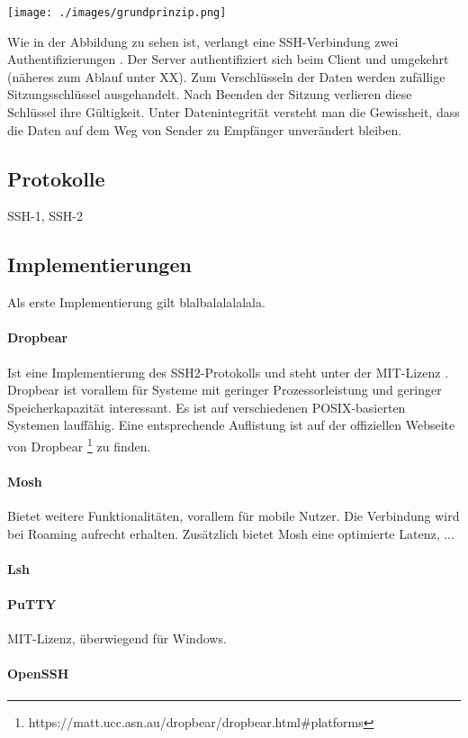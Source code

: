 \documentclass[ngerman,pdf]{wkcms}    %
\begin{document}
\texttt{[image: ./images/grundprinzip.png]}

Wie in der Abbildung zu sehen ist, verlangt eine SSH-Verbindung zwei Authentifizierungen \cite{SSH, Seite 47}. Der Server authentifiziert sich beim Client und umgekehrt (näheres zum Ablauf unter XX). Zum Verschlüsseln der Daten werden zufällige Sitzungsschlüssel ausgehandelt. Nach Beenden der Sitzung verlieren diese Schlüssel ihre Gültigkeit. Unter Datenintegrität versteht man die Gewissheit, dass die Daten auf dem Weg von Sender zu Empfänger unverändert bleiben. 


\subsection{Protokolle}
SSH-1, SSH-2

\subsection{Implementierungen}

Als erste Implementierung gilt blalbalalalalala.

\paragraph{Dropbear} Ist eine Implementierung des SSH2-Protokolls und steht unter der MIT-Lizenz \cite{dropbear}. Dropbear ist vorallem für Systeme mit geringer Prozessorleistung und geringer Speicherkapazität interessant. Es ist auf verschiedenen POSIX-basierten Systemen lauffähig. Eine entsprechende Auflistung ist auf der offiziellen Webseite von Dropbear \footnote{https://matt.ucc.asn.au/dropbear/dropbear.html\#platforms} zu finden.

\paragraph{Mosh} Bietet weitere Funktionalitäten, vorallem für mobile Nutzer. Die Verbindung wird bei Roaming aufrecht erhalten. Zusätzlich bietet Mosh eine optimierte Latenz, \Dh ...
\paragraph{Lsh}
\paragraph{PuTTY} MIT-Lizenz, überwiegend für Windows.
\paragraph{OpenSSH}
\end{document}
